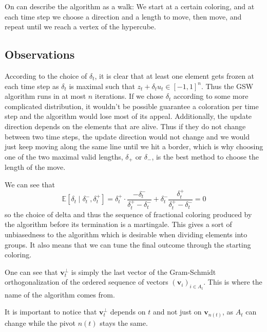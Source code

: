 \documentclass[12pt]{article}
\begin{document}
On can describe the algorithm as a walk: We start at a certain coloring, and at each time step we choose a direction and a length to move, then move, and repeat until we reach a vertex of the hypercube.


\subsection{Observations}
According to the choice of $\delta_t$, it is clear that at least one element gets frozen at each time step as $\delta_t$ is maximal such that $z_t+\delta_tu_t\in[-1,1]^n$. Thus the GSW algorithm runs in at most $n$ iterations. If we chose $\delta_t$ according to some more complicated distribution, it wouldn't be possible guarantee a coloration per time step and the algorithm would lose most of its appeal. Additionally, the update direction depends on the elements that are alive. Thus if they do not change between two time steps, the update direction would not change and we would just keep moving along the same line until we hit a border, which is why choosing one of the two maximal valid lengths, $\delta_+$ or $\delta_-$, is the best method to choose the length of the move.

We can see that
$$\mathbb{E}[\delta_t \mid \delta_t^-, \delta_t^+] = \delta_t^+ \cdot \frac{-\delta_t^-}{\delta_t^+-\delta_t^-} + \delta_t^- \frac{\delta_t^+}{\delta_t^+-\delta_t^-} =0$$
so the choice of delta and thus the sequence of fractional coloring produced by the algorithm before its termination is a martingale. This gives a sort of unbiasedness to the algorithm which is desirable when dividing elements into groups. It also means that we can tune the final outcome through the starting coloring.

One can see that $\textbf{v}^\perp _t$ is simply the last vector of the Gram-Schmidt orthogonalization of the ordered sequence of vectors $(\textbf{v}_i)_{i\in A_t}$. This is where the name of the algorithm comes from.

It is important to notice that $\textbf{v}^{\perp}_t$ depends on $t$ and not just on $\textbf{v}_{n(t)}$, as $A_t$ can change while the pivot $n(t)$ stays the same.
\end{document}

